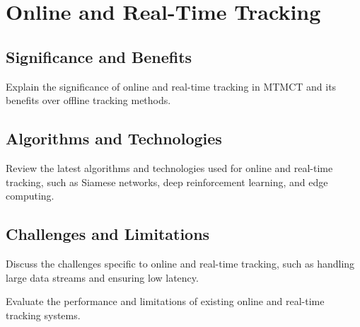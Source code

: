 \chapter{Online and Real-Time Tracking}\label{chap:online_and_real-time_tracking}

\section{Significance and Benefits}\label{sec:significance_and_benefits}
Explain the significance of online and real-time tracking in MTMCT and its benefits over offline tracking methods.

\section{Algorithms and Technologies}\label{sec:algorithms_and_technologies}
Review the latest algorithms and technologies used for online and real-time tracking, such as Siamese networks, deep reinforcement learning, and edge computing.

\section{Challenges and Limitations}\label{sec:challenges_and_limitations}
Discuss the challenges specific to online and real-time tracking, such as handling large data streams and ensuring low latency.

Evaluate the performance and limitations of existing online and real-time tracking systems.
